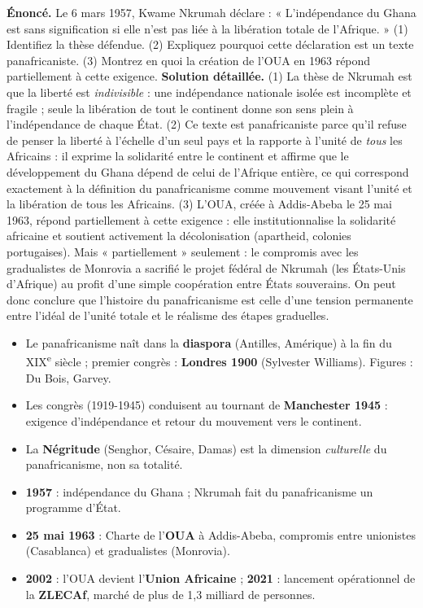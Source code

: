 \documentclass[11pt]{article}
\begin{document}
\begin{exoresolu}
\textbf{Énoncé.} Le 6 mars 1957, Kwame Nkrumah déclare : « L'indépendance du Ghana est sans signification si elle n'est pas liée à la libération totale de l'Afrique. » (1) Identifiez la thèse défendue. (2) Expliquez pourquoi cette déclaration est un texte panafricaniste. (3) Montrez en quoi la création de l'OUA en 1963 répond partiellement à cette exigence.
\tcblower
\textbf{Solution détaillée.} (1) La thèse de Nkrumah est que la liberté est \emph{indivisible} : une indépendance nationale isolée est incomplète et fragile ; seule la libération de tout le continent donne son sens plein à l'indépendance de chaque État. (2) Ce texte est panafricaniste parce qu'il refuse de penser la liberté à l'échelle d'un seul pays et la rapporte à l'unité de \emph{tous} les Africains : il exprime la solidarité entre le continent et affirme que le développement du Ghana dépend de celui de l'Afrique entière, ce qui correspond exactement à la définition du panafricanisme comme mouvement visant l'unité et la libération de tous les Africains. (3) L'OUA, créée à Addis-Abeba le 25 mai 1963, répond partiellement à cette exigence : elle institutionnalise la solidarité africaine et soutient activement la décolonisation (apartheid, colonies portugaises). Mais « partiellement » seulement : le compromis avec les gradualistes de Monrovia a sacrifié le projet fédéral de Nkrumah (les États-Unis d'Afrique) au profit d'une simple coopération entre États souverains. On peut donc conclure que l'histoire du panafricanisme est celle d'une tension permanente entre l'idéal de l'unité totale et le réalisme des étapes graduelles.
\end{exoresolu}

\begin{aretenir}
\begin{itemize}
\item Le panafricanisme naît dans la \textbf{diaspora} (Antilles, Amérique) à la fin du XIX\textsuperscript{e} siècle ; premier congrès : \textbf{Londres 1900} (Sylvester Williams). Figures : Du Bois, Garvey.
\item Les congrès (1919-1945) conduisent au tournant de \textbf{Manchester 1945} : exigence d'indépendance et retour du mouvement vers le continent.
\item La \textbf{Négritude} (Senghor, Césaire, Damas) est la dimension \emph{culturelle} du panafricanisme, non sa totalité.
\item \textbf{1957} : indépendance du Ghana ; Nkrumah fait du panafricanisme un programme d'État.
\item \textbf{25 mai 1963} : Charte de l'\textbf{OUA} à Addis-Abeba, compromis entre unionistes (Casablanca) et gradualistes (Monrovia).
\item \textbf{2002} : l'OUA devient l'\textbf{Union Africaine} ; \textbf{2021} : lancement opérationnel de la \textbf{ZLECAf}, marché de plus de 1,3 milliard de personnes.
\end{itemize}
\end{aretenir}
\end{document}
